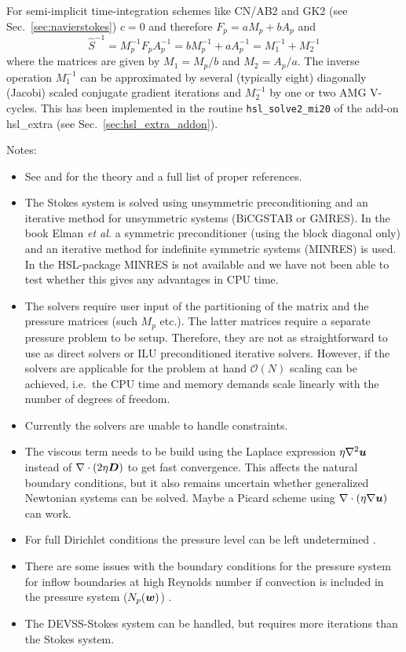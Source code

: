 For semi-implicit time-integration schemes like CN/AB2 and GK2 (see
Sec.~\ref{sec:navierstokes}) $c=0$ and therefore
 $F_p=aM_p+bA_p$ and
\begin{equation}
   \hat S^{-1} = M_p^{-1} F_pA_p^{-1}= bM_p^{-1}+aA_p^{-1}=M_1^{-1}+M_2^{-1}
\label{eq:stokes_helmholtz_precon}
\end{equation}
where the matrices are given by $M_1=M_p/b$ and $M_2=A_p/a$.
The inverse operation
$M_1^{-1}$ can be approximated by several (typically eight)
diagonally (Jacobi) scaled conjugate gradient iterations and 
$M_2^{-1}$ by one or two AMG V-cycles.
This has been implemented in the routine \texttt{hsl\_solve2\_mi20}
of the add-on hsl\_extra (see Sec.~\ref{sec:hsl_extra_addon}).

Notes:
\begin{itemize}
   \item See \cite{Elman05} and \cite{Kay08} for the theory and a full list of
proper references.
   \item The Stokes system is solved using unsymmetric preconditioning and an
iterative method for unsymmetric systems (BiCGSTAB or GMRES). In the book Elman
\emph{et al.} \cite{Elman05} a symmetric preconditioner (using the block
diagonal only) and an iterative method for indefinite symmetric systems
(MINRES) is
used. In the HSL-package MINRES is not available and we have not been able to
test whether this gives any advantages in CPU time.
\item The solvers require user input of the partitioning of the matrix
      and the pressure matrices (such $M_p$ etc.).
      The latter matrices require a separate pressure
      problem to be setup. Therefore, they are not as straightforward to use
      as direct solvers or ILU preconditioned iterative solvers. However, if
      the solvers are applicable for the problem at hand $\mathcal{O}(N)$
      scaling can be achieved, i.e.\ the CPU time and memory demands scale
      linearly with the number of degrees of freedom.
\item Currently the solvers are unable to handle constraints.
\item The viscous term needs to be build using the Laplace expression
      $\eta\nabla^2\boldsymbol{u}$ instead of $\nabla\cdot(2\eta\boldsymbol{D})$ to get fast
      convergence. This affects the natural boundary conditions, but it also
remains uncertain whether generalized Newtonian systems can be solved. Maybe a
Picard scheme using $\nabla\cdot(\eta\nabla\boldsymbol{u})$ can work.
\item For full Dirichlet conditions the pressure level can be left undetermined
      \cite{Elman05}.
\item There are some issues with the boundary conditions for the pressure
      system for inflow boundaries at high Reynolds number if convection is
      included in the pressure system ($N_p(\boldsymbol{w})$) \cite{Elman05}.
\item The DEVSS-Stokes system can be handled, but requires more iterations than
      the Stokes system.
\end{itemize}

